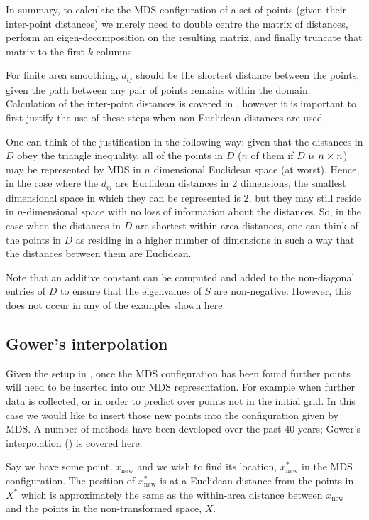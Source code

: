 In summary, to calculate the MDS configuration of a set of points (given their inter-point distances) we merely need to double centre the matrix of distances, perform an eigen-decomposition on the resulting matrix, and finally truncate that matrix to the first $k$ columns.

For finite area smoothing, $d_{ij}$ should be the shortest distance between the points, given the path between any pair of points remains within the domain. Calculation of the inter-point distances is covered in , however it is important to first justify the use of these steps when non-Euclidean distances are used. 

One can think of the justification in the following way: given that the distances in $D$ obey the triangle inequality, all of the points in $D$ ($n$ of them if $D$ is $n \times n$) may be represented by MDS in $n$ dimensional Euclidean space (at worst). Hence, in the case where the $d_{ij}$ are Euclidean distances in 2 dimensions, the smallest dimensional space in which they can be represented is 2, but they may still reside in $n$-dimensional space with no loss of information about the distances. So, in the case when the distances in $D$ are shortest within-area distances, one can think of the points in $D$ as residing in a higher number of dimensions in such a way that the distances between them are Euclidean.

Note that an additive constant can be computed and added to the non-diagonal entries of $D$ to ensure that the eigenvalues of $S$ are non-negative. However, this does not occur in any of the examples shown here.

\subsection{Gower's interpolation} 
\label{gowers}
Given the setup in , once the MDS configuration has been found further points will need to be inserted into our MDS representation. For example when further data is collected, or in order to predict over points not in the initial grid. In this case we would like to insert those new points into the configuration given by MDS. A number of methods have been developed over the past 40 years; Gower's interpolation (\cite{gower1968}) is covered here.

Say we have some point, $x_{\text{new}}$ and we wish to find its location, $x^*_{\text{new}}$ in the MDS configuration. The position of $x^*_{\text{new}}$ is at a Euclidean distance from the points in $X^*$ which is approximately the same as the within-area distance between $x_{\text{new}}$ and the points in the non-transformed space, $X$. 

